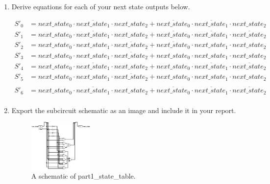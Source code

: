 \documentclass{article}
\begin{document}
\begin{enumerate}
\begin{table}[ht!]
\begin{tabular}{cccc|ccc}
\end{tabular}
\end{table}

\item Derive equations for each of your next state outputs below.

\begin{align*}
    S'_0 &= next\_state_0 \cdot \overline{next\_state_1} \cdot next\_state_2 + \overline{next\_state_0} \cdot \overline{next\_state_1} \cdot next\_state_2 \\
    S'_1 &= next\_state_0 \cdot \overline{next\_state_1} \cdot next\_state_2 + \overline{next\_state_0} \cdot \overline{next\_state_1} \cdot \overline{next\_state_2}   \\
    S'_2 &= next\_state_0 \cdot next\_state_1 \cdot \overline{next\_state_2} + \overline{next\_state_0} \cdot next\_state_1 \cdot next\_state_2  \\
    S'_3 &= next\_state_0 \cdot next\_state_1 \cdot \overline{next\_state_2}  + next\_state_0 \cdot next\_state_1 \cdot next\_state_2 \\
    S'_4 &= next\_state_0 \cdot \overline{next\_state_1} \cdot next\_state_2 + next\_state_0 \cdot \overline{next\_state_1} \cdot \overline{next\_state_2} \\
    S'_5 &= next\_state_0 \cdot next\_state_1 \cdot \overline{next\_state_2}  + next\_state_0 \cdot next\_state_1 \cdot next\_state_2 \\ \\
    S'_6 &= next\_state_0 \cdot \overline{next\_state_1} \cdot next\_state_2 + \overline{next\_state_0} \cdot \overline{next\_state_1} \cdot \overline{next\_state_2}  \\
\end{align*}

\item Export the subcircuit schematic as an image and include it in your report.

\begin{figure}[ht!]
    \centering
    \includegraphics[width=0.3\textwidth]{lab6_part1_next_state.png}
    \caption{A schematic of part1\_state\_table.}
    \label{f:part1_state_table}
\end{figure}


\end{enumerate}
\end{document}
